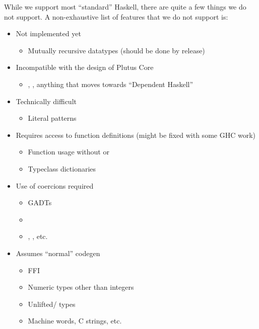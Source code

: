 While we support most ``standard'' Haskell, there are quite a few things we do not support. A non-exhaustive list of features that we do not support is:
\begin{itemize}
\item Not implemented yet
  \begin{itemize}
  \item Mutually recursive datatypes (should be done by release)
  \end{itemize}
\item Incompatible with the design of Plutus Core
  \begin{itemize}
    \item {}, , anything that moves towards ``Dependent Haskell''
  \end{itemize}
\item Technically difficult
  \begin{itemize}
  \item Literal patterns
  \end{itemize}
\item Requires access to function definitions (might be fixed with some GHC work)
  \begin{itemize}
  \item Function usage without  or 
  \item Typeclass dictionaries
  \end{itemize}
\item Use of coercions required
  \begin{itemize}
  \item GADTs
  \item {}
  \item {}, , etc.
  \end{itemize}
\item Assumes ``normal'' codegen
  \begin{itemize}
  \item FFI
  \item Numeric types other than integers
  \item Unlifted/ types
  \item Machine words, C strings, etc.
  \end{itemize}
\end{itemize}


